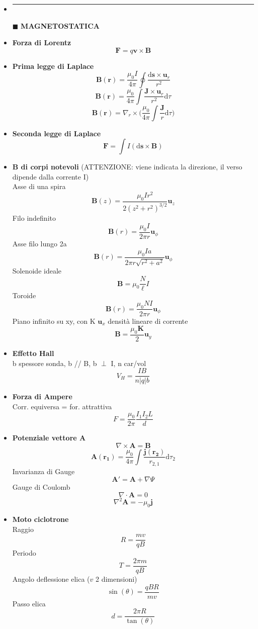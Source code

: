 \documentclass{book}
\newcommand{\g}{\textbf}
\newcommand{\h}{\mathbf}
\newcommand{\e}{\begin{equation}}
\newcommand{\ex}{\end{equation} }
\renewcommand{\it}{\item[$\cdot$]}
\newcommand{\sep}{\item[]\rule{\linewidth}{0.4pt}}
\begin{document}
\begin{multicols}{4}
\begin{itemize}
\sep
\item [$\blacksquare$] \g{MAGNETOSTATICA}
    \it \g{Forza di Lorentz}
        \e{\h{F}=q\h{v}\times\h{B}}\ex
    \it \g{Prima legge di Laplace}
        \e{\h{B}(\h{r})=\frac{\mu_0 I}{4\pi}\oint\frac{\mathrm{d}\h{s}\times\h{u}_r}{r^2}} \ex
        \e{\h{B}(\h{r})=\frac{\mu_0}{4\pi}\int\frac{\h{J}\times\h{u}_r}{r^2} \mathrm{d}\tau} \ex
        \e{\h{B}(\h{r})=\nabla_r\times\biggl(\frac{\mu_0}{4\pi}\int\frac{\h{J}}{r}\mathrm{d}\tau\biggr)} \ex
    \it \g{Seconda legge di Laplace}
        \e{\h{F}=\int I(\mathrm{d}\h{s}\times \h{B})} \ex
    \it \g{B di corpi notevoli} (ATTENZIONE: viene indicata la direzione, il verso dipende dalla corrente I) \\
    Asse di una spira
        \e{\h{B}(z)=\frac{\mu_0Ir^2}{2(z^2+r^2)^{3/2}}\h{u}_z} \ex
    Filo indefinito
        \e{\h{B}(r)=\frac{\mu_0I}{2\pi r}\h{u}_\phi} \ex
    Asse filo lungo 2a
        \e{\h{B}(r)=\frac{\mu_0Ia}{2\pi r \sqrt{r^2+a^2}}\h{u}_\phi} \ex
    Solenoide ideale
        \e{\h{B}=\mu_0\frac{N}{\ell}I}\ex
    Toroide
        \e{\h{B}(r)=\frac{\mu_0NI}{2\pi r}\h{u}_\phi} \ex
    Piano infinito su xy, con K $\h{u}_{x}$ densità lineare di corrente
        \e{\h{B}=\frac{\mu_0 \h{K}}{2}\h{u}_y} \ex
    \it \g{Effetto Hall} \\
    b spessore sonda, b // B, b $\perp$ I, n car/vol
        \e{V_H=\frac{IB}{n|q|b}} \ex
    \it \g{Forza di Ampere} \\
    Corr. equiversa = for. attrattiva 
        \e{F = \frac{\mu_0}{2\pi} \frac{I_1 I_2 L}{d}}\ex
    \it \g{Potenziale vettore A}
        \e{\nabla\times\h{A}=\h{B}}\ex
        \e{\h{A}(\h{r_1})=\frac{\mu_0}{4\pi}\int\frac{\h{j}(\h{r_2})}{r_{2,1}}\mathrm{d}\tau_2}\ex
    Invarianza di Gauge
        \e{\h{A'}=\h{A}+\nabla\Psi}\ex
    Gauge di Coulomb
        \e{\nabla\cdot \h{A}=0}\ex
        \e{\nabla^2\h{A}=-\mu_0\h{j}}\ex
    \it \g{Moto ciclotrone} \\
        Raggio
        \e{R = \frac{mv}{qB}}\ex 
        Periodo 
        \e{T = \frac{2\pi m}{qB}}\ex 
        Angolo deflessione elica ($v$ 2 dimensioni) 
        \e{\sin(\theta) = \frac{qBR}{mv}}\ex 
        Passo elica 
        \e{d=\frac{2\pi R}{\tan(\theta)}} \ex


\end{itemize}
\end{multicols}
\end{document}
